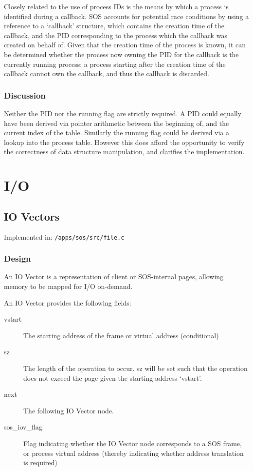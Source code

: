 \documentclass[a4paper,12pt]{article}
\begin{document}
Closely related to the use of process IDs is the means by which a process is
identified during a callback.  SOS accounts for potential race conditions by
using a reference to a `callback' structure, which contains the creation time
of the callback, and the PID corresponding to the process which the callback
was created on behalf of.  Given that the creation time of the process is
known, it can be determined whether the process now owning the PID for the
callback is the currently running process; a process starting after the
creation time of the callback cannot own the callback, and thus the callback
is discarded.

\subsubsection{Discussion}
Neither the PID nor the running flag are strictly required.  A PID could
equally have been derived via pointer arithmetic between the beginning of,
and the current index of the table.  Similarly the running flag could be
derived via a lookup into the process table.  However this does afford the
opportunity to verify the correctness of data structure manipulation, and
clarifies the implementation.

\section{I/O}
\subsection{IO Vectors}
Implemented in: \texttt{/apps/sos/src/file.c}

\subsubsection{Design}
An IO Vector is a representation of client or SOS-internal pages, allowing
memory to be mapped for I/O on-demand.

An IO Vector provides the following fields:
\begin{description}
\item[vstart] The starting address of the frame or virtual address (conditional)
\item[sz] The length of the operation to occur.  sz will be set such that the
  operation does not exceed the page given the starting address `vstart'.
\item[next] The following IO Vector node.
\item[sos\_iov\_flag] Flag indicating whether the IO Vector node corresponds to
  a SOS frame, or process virtual address (thereby indicating whether
  address translation is required)
\end{description}
\end{document}
